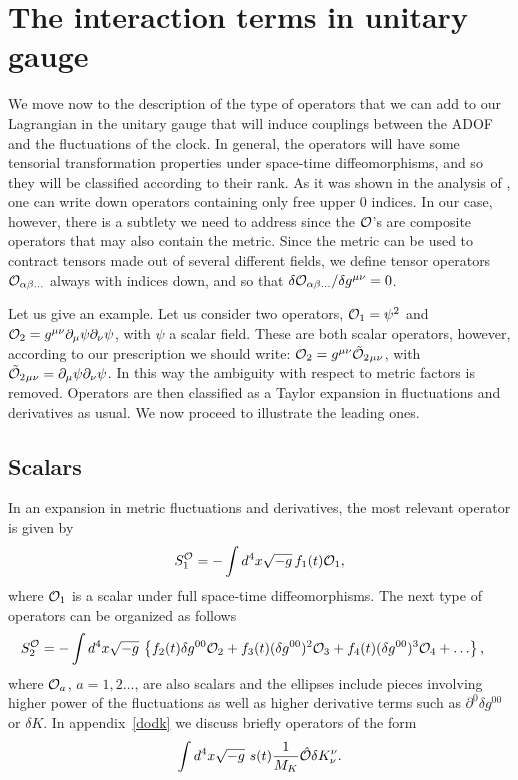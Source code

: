 \documentclass[11pt,amsmath,floats,floatfix,nofootinbib,secnumarabic, superscriptaddress, tightenlines]{revtex4}
\newcommand{\beq}{\begin{equation}}
\newcommand{\eeq}{\end{equation}}
\newcommand{\calo}{{\cal O}}
\begin{document}
{\section{The interaction terms in unitary gauge}\label{InterADOF}

We move now to the description of the type of operators that we can add to our Lagrangian in the unitary gauge that will induce couplings between the ADOF and the fluctuations of the clock. In general, the operators will have some tensorial transformation properties under space-time diffeomorphisms, and so they will be classified according to their rank.  As it was shown in the analysis of \cite{eft1, multieft}, one can write down operators containing only free upper 0 indices. In our case, however, there is a subtlety we need to address since the $\calo$'s are composite operators that may also contain the metric. Since the metric can be used to contract tensors made out of several different fields, we define tensor operators $\calo_{\alpha\beta\ldots}$ always with indices down, and so that $\delta {\calo}_{\alpha\beta\ldots}/\delta g^{\mu\nu}=0$.

Let us give an example. Let us consider two operators, ${\calo}_1=\psi^2$ and ${\calo}_2=g^{\mu\nu}\partial_\mu\psi\partial_\nu\psi$, with $\psi$ a scalar field. These are both scalar operators, however, according to our prescription we should write:
${\calo}_2=g^{\mu\nu}\tilde{\calo}_2{}_{\mu\nu}$, with $\tilde{\calo}_2{}_{\mu\nu}=\partial_\mu\psi\partial_\nu\psi$. In this way the ambiguity with respect to metric factors is removed. Operators are then classified as a Taylor expansion in fluctuations and derivatives as usual. We now proceed to illustrate the leading ones.

\subsection{Scalars}\label{scaladof}

In an expansion in metric fluctuations and derivatives, the most relevant operator is given by
\begin{equation}\label{inter1n}
S^{\calo}_1=-\int d^4 x \sqrt{-g}\,   f_1(t)\calo_1,
\end{equation}
where $\calo_1$ is a scalar under full space-time diffeomorphisms. The next type of operators can be organized as follows
\begin{align}
S^{\calo}_2&=-\int d^4 x \sqrt{-g}\, \left\{f_2(t)\delta g^{00} \calo_2+ f_3(t)(\delta g^{00})^2 \calo_3+ f_4(t)(\delta g^{00})^3 \calo_4+\ldots\right\}, \label{inter2}
\end{align}
where $\calo_a$, $a=1,2\ldots$, are also scalars and the ellipses include pieces involving higher power of the fluctuations as well as higher derivative terms  such as $\partial^0 \delta g^{00}$ or $\delta K$. In appendix~\ref{dodk} we discuss briefly operators of the form \beq
\label{extcalotr}
\int d^4x \sqrt{-g}~s(t) \frac{1}{M_K} \hat\calo \delta K^\nu_\nu .
\eeq

}
\end{document}
